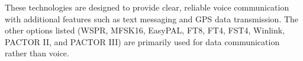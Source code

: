 These technologies are designed to provide clear, reliable voice communication with additional features such as text messaging and GPS data transmission. The other options listed (WSPR, MFSK16, EasyPAL, FT8, FT4, FST4, Winlink, PACTOR II, and PACTOR III) are primarily used for data communication rather than voice.

